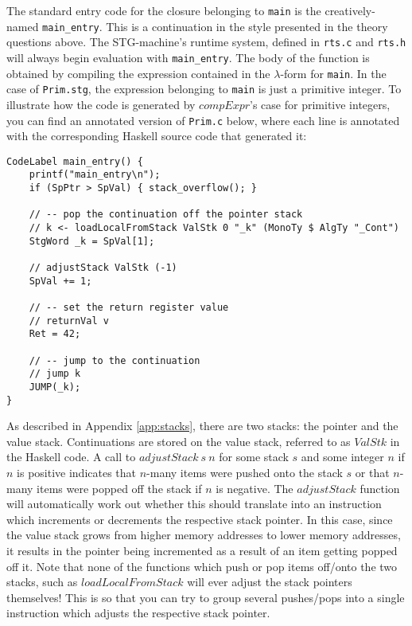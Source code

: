 \documentclass[10pt,a4paper]{exam} %
\begin{document}
\begin{questions}
The standard entry code for the closure belonging to \texttt{main} is the creatively-named \texttt{main\_entry}. This is a continuation in the style presented in the theory questions above. The STG-machine's runtime system, defined in \texttt{rts.c} and \texttt{rts.h} will always begin evaluation with \texttt{main\_entry}. The body of the function is obtained by compiling the expression contained in the $\lambda$-form for \texttt{main}. In the case of \texttt{Prim.stg}, the expression belonging to \texttt{main} is just a primitive integer. To illustrate how the code is generated by $\mathit{compExpr}$'s case for primitive integers, you can find an annotated version of \texttt{Prim.c} below, where each line is annotated with the corresponding Haskell source code that generated it:
\begin{verbatim}
CodeLabel main_entry() {
    printf("main_entry\n");
    if (SpPtr > SpVal) { stack_overflow(); }
    
    // -- pop the continuation off the pointer stack
    // k <- loadLocalFromStack ValStk 0 "_k" (MonoTy $ AlgTy "_Cont")
    StgWord _k = SpVal[1];
    
    // adjustStack ValStk (-1)
    SpVal += 1;
    
    // -- set the return register value
    // returnVal v
    Ret = 42;
    
    // -- jump to the continuation
    // jump k
    JUMP(_k);
}
\end{verbatim}
As described in Appendix \ref{app:stacks}, there are two stacks: the pointer and the value stack. Continuations are stored on the value stack, referred to as $\mathit{ValStk}$ in the Haskell code. A call to $\mathit{adjustStack~s~n}$ for some stack $s$ and some integer $n$ if $n$ is positive indicates that $n$-many items were pushed onto the stack $s$ or that $n$-many items were popped off the stack if $n$ is negative. The $\mathit{adjustStack}$ function will automatically work out whether this should translate into an instruction which increments or decrements the respective stack pointer. In this case, since the value stack grows from higher memory addresses to lower memory addresses, it results in the pointer being incremented as a result of an item getting popped off it. Note that none of the functions which push or pop items off/onto the two stacks, such as $\mathit{loadLocalFromStack}$ will ever adjust the stack pointers themselves! This is so that you can try to group several pushes/pops into a single instruction which adjusts the respective stack pointer.


\end{questions}
\end{document}
